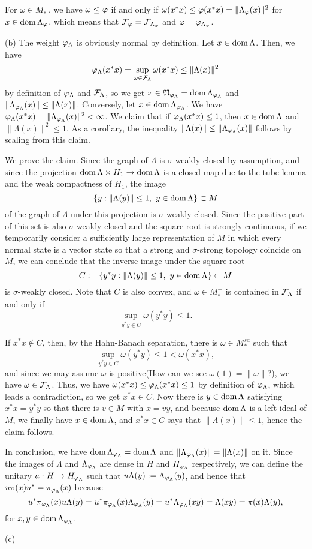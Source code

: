 \documentclass{../../large}
\begin{document}
\begin{pf}
For $\omega\in M_*^+$, we have $\omega\le\varphi$ if and only if $\omega(x^*x)\le\varphi(x^*x)=\|\Lambda_\varphi(x)\|^2$ for $x\in\operatorname{dom}\Lambda_\varphi$, which means that $\mathcal{F}_\varphi=\mathcal{F}_{\Lambda_\varphi}$ and $\varphi=\varphi_{\Lambda_\varphi}$.

(b)
The weight $\varphi_\Lambda$ is obviously normal by definition.
Let $x\in\operatorname{dom}\Lambda$.
Then, we have
\[\varphi_\Lambda(x^*x)=\sup_{\omega\in\mathcal{F}_\Lambda}\omega(x^*x)\le\|\Lambda(x)\|^2\]
by definition of $\varphi_\Lambda$ and $\mathcal{F}_\Lambda$, so we get $x\in\mathfrak{N}_{\varphi_\Lambda}=\operatorname{dom}\Lambda_{\varphi_\Lambda}$ and $\|\Lambda_{\varphi_\Lambda}(x)\|\le\|\Lambda(x)\|$.
Conversely, let $x\in\operatorname{dom}\Lambda_{\varphi_\Lambda}$.
We have $\varphi_\Lambda(x^*x)=\|\Lambda_{\varphi_\Lambda}(x)\|^2<\infty$.
We claim that if $\varphi_\Lambda(x^*x)\le1$, then $x\in\operatorname{dom}\Lambda$ and $\|\Lambda(x)\|^2\le1$.
As a corollary, the inequality $\|\Lambda(x)\|\le\|\Lambda_{\varphi_\Lambda}(x)\|$ follows by scaling from this claim.

We prove the claim.
Since the graph of $\Lambda$ is $\sigma$-weakly closed by assumption, and since the projection $\operatorname{dom}\Lambda\times H_1\to\operatorname{dom}\Lambda$ is a closed map due to the tube lemma and the weak compactness of $H_1$, the image
\[\{y:\|\Lambda(y)\|\le1,\ y\in\dom\Lambda\}\subset M\]
of the graph of $\Lambda$ under this projection is $\sigma$-weakly closed.
Since the positive part of this set is also $\sigma$-weakly closed and the square root is strongly continuous, if we temporarily consider a sufficiently large representation of $M$ in which every normal state is a vector state so that a strong and $\sigma$-strong topology coincide on $M$, we can conclude that the inverse image under the square root
\[C:=\{y^*y:\|\Lambda(y)\|\le1,\ y\in\dom\Lambda\}\subset M\]
is $\sigma$-weakly closed.
Note that $C$ is also convex, and $\omega\in M_*^+$ is contained in $\mathcal{F}_\Lambda$ if and only if
\[\sup_{y^*y\in C}\omega(y^*y)\le1.\]

If $x^*x\notin C$, then, by the Hahn-Banach separation, there is $\omega\in M_*^{sa}$ such that
\[\sup_{y^*y\in C}\omega(y^*y)\le1<\omega(x^*x),\]
and since we may assume $\omega$ is positive(How can we see $\omega(1)=\|\omega\|$?), we have $\omega\in\mathcal{F}_\Lambda$.
Thus, we have $\omega(x^*x)\le\varphi_\Lambda(x^*x)\le1$ by definition of $\varphi_\Lambda$, which leads a contradiction, so we get $x^*x\in C$.
Now there is $y\in\operatorname{dom}\Lambda$ satisfying $x^*x=y^*y$ so that there is $v\in M$ with $x=vy$, and because $\operatorname{dom}\Lambda$ is a left ideal of $M$, we finally have $x\in\operatorname{dom}\Lambda$, and $x^*x\in C$ says that $\|\Lambda(x)\|\le1$, hence the claim follows.

In conclusion, we have $\operatorname{dom}\Lambda_{\varphi_\Lambda}=\operatorname{dom}\Lambda$ and $\|\Lambda_{\varphi_\Lambda}(x)\|=\|\Lambda(x)\|$ on it.
Since the images of $\Lambda$ and $\Lambda_{\varphi_\Lambda}$ are dense in $H$ and $H_{\varphi_\Lambda}$ respectively, we can define the unitary $u:H\to H_{\varphi_\Lambda}$ such that $u\Lambda(y):=\Lambda_{\varphi_\Lambda}(y)$, and hence that $u\pi(x)u^*=\pi_{\varphi_\Lambda}(x)$ because
\[u^*\pi_{\varphi_\Lambda}(x)u\Lambda(y)=u^*\pi_{\varphi_\Lambda}(x)\Lambda_{\varphi_\Lambda}(y)=u^*\Lambda_{\varphi_\Lambda}(xy)=\Lambda(xy)=\pi(x)\Lambda(y),\]
for $x,y\in\operatorname{dom}\Lambda_{\varphi_\Lambda}$.

(c)
\end{pf}
\end{document}
